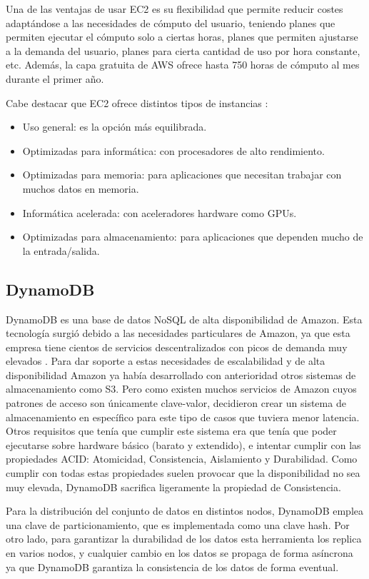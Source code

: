 Una de las ventajas de usar EC2 es su flexibilidad que permite reducir costes adaptándose a las necesidades de cómputo del usuario, teniendo planes que permiten ejecutar el cómputo solo a ciertas horas, planes que permiten ajustarse a la demanda del usuario, planes para cierta cantidad de uso por hora constante, etc. Además, la capa gratuita de AWS ofrece hasta 750 horas de cómputo al mes durante el primer año.

Cabe destacar que EC2 ofrece distintos tipos de instancias \cite{ec2_instances}:
\begin{itemize}
    \item Uso general: es la opción más equilibrada.
    \item Optimizadas para informática: con procesadores de alto rendimiento.
    \item Optimizadas para memoria: para aplicaciones que necesitan trabajar con muchos datos en memoria.
    \item Informática acelerada: con aceleradores hardware como GPUs.
    \item Optimizadas para almacenamiento: para aplicaciones que dependen mucho de la entrada/salida.
\end{itemize}

\subsection{DynamoDB}

DynamoDB es una base de datos NoSQL de alta disponibilidad de Amazon. Esta tecnología surgió debido a las necesidades particulares de Amazon, ya que esta empresa tiene cientos de servicios descentralizados con picos de demanda muy elevados \cite{amazon_dynamodb}. Para dar soporte a estas necesidades de escalabilidad y de alta disponibilidad Amazon ya había desarrollado con anterioridad otros sistemas de almacenamiento como S3. Pero como existen muchos servicios de Amazon cuyos patrones de acceso son únicamente clave-valor, decidieron crear un sistema de almacenamiento en específico para este tipo de casos que tuviera menor latencia. Otros requisitos que tenía que cumplir este sistema era que tenía que poder ejecutarse sobre hardware básico (barato y extendido), e intentar cumplir con las propiedades ACID: Atomicidad, Consistencia, Aislamiento y Durabilidad. Como cumplir con todas estas propiedades suelen provocar que la disponibilidad no sea muy elevada, DynamoDB sacrifica ligeramente la propiedad de Consistencia.

Para la distribución del conjunto de datos en distintos nodos, DynamoDB emplea una clave de particionamiento, que es implementada como una clave hash. Por otro lado, para garantizar la durabilidad de los datos esta herramienta los replica en varios nodos, y cualquier cambio en los datos se propaga de forma asíncrona ya que DynamoDB garantiza la consistencia de los datos de forma eventual.

